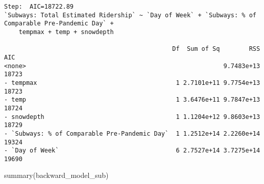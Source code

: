 \documentclass[
  letterpaper,
  DIV=11,
  numbers=noendperiod]{scrartcl}
\newenvironment{Shaded}{\begin{snugshade}}{\end{snugshade}}
\newcommand{\FunctionTok}[1]{\textcolor[rgb]{0.28,0.35,0.67}{#1}}
\newcommand{\NormalTok}[1]{\textcolor[rgb]{0.00,0.23,0.31}{#1}}
\begin{document}
\begin{verbatim}
Step:  AIC=18722.89
`Subways: Total Estimated Ridership` ~ `Day of Week` + `Subways: % of Comparable Pre-Pandemic Day` + 
    tempmax + temp + snowdepth

                                              Df  Sum of Sq        RSS   AIC
<none>                                                      9.7483e+13 18723
- tempmax                                      1 2.7101e+11 9.7754e+13 18723
- temp                                         1 3.6476e+11 9.7847e+13 18724
- snowdepth                                    1 1.1204e+12 9.8603e+13 18729
- `Subways: % of Comparable Pre-Pandemic Day`  1 1.2512e+14 2.2260e+14 19324
- `Day of Week`                                6 2.7527e+14 3.7275e+14 19690
\end{verbatim}

\begin{Shaded}
\begin{Highlighting}[]
\FunctionTok{summary}\NormalTok{(backward\_model\_sub)}
\end{Highlighting}
\end{Shaded}
\end{document}
